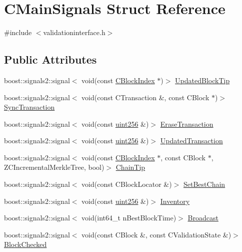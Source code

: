 \hypertarget{struct_c_main_signals}{}\section{C\+Main\+Signals Struct Reference}
\label{struct_c_main_signals}


{\ttfamily \#include $<$validationinterface.\+h$>$}

\subsection*{Public Attributes}
\begin{DoxyCompactItemize}
\item 
boost\+::signals2\+::signal$<$ void(const \mbox{\hyperlink{class_c_block_index}{C\+Block\+Index}} $\ast$)$>$ \mbox{\hyperlink{struct_c_main_signals_a0380ea185992a8ee3572b5cf2aaa7677}{Updated\+Block\+Tip}}
\item 
boost\+::signals2\+::signal$<$ void(const C\+Transaction \&, const C\+Block $\ast$)$>$ \mbox{\hyperlink{struct_c_main_signals_a7ced7f332ed90d57110a78ad50d5a60f}{Sync\+Transaction}}
\item 
boost\+::signals2\+::signal$<$ void(const \mbox{\hyperlink{classuint256}{uint256}} \&)$>$ \mbox{\hyperlink{struct_c_main_signals_a1bb8e6808c2086e4045ecd8f356a12e4}{Erase\+Transaction}}
\item 
boost\+::signals2\+::signal$<$ void(const \mbox{\hyperlink{classuint256}{uint256}} \&)$>$ \mbox{\hyperlink{struct_c_main_signals_a460e5e468e8e4a9493fe1685b77c57e0}{Updated\+Transaction}}
\item 
boost\+::signals2\+::signal$<$ void(const \mbox{\hyperlink{class_c_block_index}{C\+Block\+Index}} $\ast$, const C\+Block $\ast$, Z\+C\+Incremental\+Merkle\+Tree, bool)$>$ \mbox{\hyperlink{struct_c_main_signals_abaf6911904d514ad1d9f2c81a4faa08b}{Chain\+Tip}}
\item 
boost\+::signals2\+::signal$<$ void(const C\+Block\+Locator \&)$>$ \mbox{\hyperlink{struct_c_main_signals_a11f2f18522ff7aa672eb5cc8c1f397b2}{Set\+Best\+Chain}}
\item 
boost\+::signals2\+::signal$<$ void(const \mbox{\hyperlink{classuint256}{uint256}} \&)$>$ \mbox{\hyperlink{struct_c_main_signals_a2f8f94d91265dc946e97614042698a7b}{Inventory}}
\item 
boost\+::signals2\+::signal$<$ void(int64\+\_\+t n\+Best\+Block\+Time)$>$ \mbox{\hyperlink{struct_c_main_signals_a57ba54e641838bc03d0bbda30796c0c9}{Broadcast}}
\item 
boost\+::signals2\+::signal$<$ void(const C\+Block \&, const C\+Validation\+State \&)$>$ \mbox{\hyperlink{struct_c_main_signals_a9419bb09211f46bdc7f214e9d94f1bd7}{Block\+Checked}}
\end{DoxyCompactItemize}


